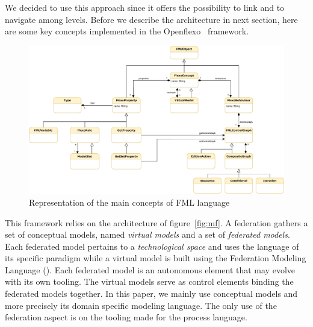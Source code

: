 We decided to use this approach since it offers the possibility to
link and to navigate among levels. Before we describe the 
architecture in next section, here are some key concepts implemented
in the Openflexo~\parencite{openflexo_link} framework.



\begin{figure}
    \centering
    \includegraphics[width=1.0 \textwidth]{Figures/FMLMetaModel.pdf}
    \caption{Representation of the main concepts of {FML} language}
    \label{fig:mm}
\end{figure}

This framework relies on the architecture of figure~\ref{fig:mf}. A federation
gathers a set of conceptual models, named \emph{virtual models} and a
set of \emph{federated models}. Each federated model pertains to a
\emph{technological space} and uses the language of its specific
paradigm while a virtual model is built using the Federation Modeling
Language (\FML). Each federated model is an autonomous
element that may evolve with its own tooling. The virtual models
serve as control elements binding the federated models together.
In this paper, we mainly use conceptual models and more precisely \FML its domain specific modeling language. The only use of the federation aspect is on the tooling made for the process language.

